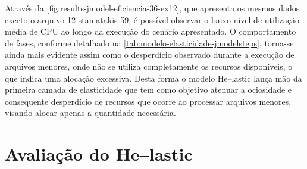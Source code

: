 \documentclass[english,brazilian]{UNISINOSmonografia} %
\begin{document}
Através da \autoref{fig:results-jmodel-eficiencia-36-ex12}, que apresenta os mesmos dados exceto o arquivo 12-stamatakis-59, é possível observar o baixo nível de utilização média de CPU ao longo da execução do cenário apresentado.
%
O comportamento de fases, conforme detalhado na \autoref{tab:modelo-elasticidade-jmodelsteps}, torna-se ainda mais evidente assim como o desperdício observado durante a execução de arquivos menores, onde não se utiliza completamente os recursos disponíveis, o que indica uma alocação excessiva.
%
Desta forma o modelo \textsf{He}--lastic lança mão da primeira camada de elasticidade que tem como objetivo atenuar a ociosidade e consequente desperdício de recursos que ocorre ao processar arquivos menores, visando alocar apenas a quantidade necessária.





\section{Avaliação do \textsf{He}--lastic}
\end{document}
